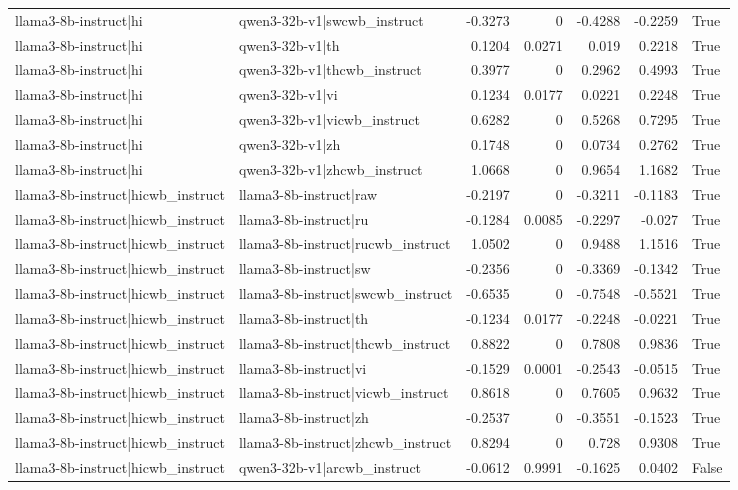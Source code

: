 \begin{table}
\begin{tabular}{l l r r r r l}
llama3-8b-instruct|hi & qwen3-32b-v1|swcwb_instruct & -0.3273 & 0 & -0.4288 & -0.2259 & True \\
llama3-8b-instruct|hi & qwen3-32b-v1|th & 0.1204 & 0.0271 & 0.019 & 0.2218 & True \\
llama3-8b-instruct|hi & qwen3-32b-v1|thcwb_instruct & 0.3977 & 0 & 0.2962 & 0.4993 & True \\
llama3-8b-instruct|hi & qwen3-32b-v1|vi & 0.1234 & 0.0177 & 0.0221 & 0.2248 & True \\
llama3-8b-instruct|hi & qwen3-32b-v1|vicwb_instruct & 0.6282 & 0 & 0.5268 & 0.7295 & True \\
llama3-8b-instruct|hi & qwen3-32b-v1|zh & 0.1748 & 0 & 0.0734 & 0.2762 & True \\
llama3-8b-instruct|hi & qwen3-32b-v1|zhcwb_instruct & 1.0668 & 0 & 0.9654 & 1.1682 & True \\
llama3-8b-instruct|hicwb_instruct & llama3-8b-instruct|raw & -0.2197 & 0 & -0.3211 & -0.1183 & True \\
llama3-8b-instruct|hicwb_instruct & llama3-8b-instruct|ru & -0.1284 & 0.0085 & -0.2297 & -0.027 & True \\
llama3-8b-instruct|hicwb_instruct & llama3-8b-instruct|rucwb_instruct & 1.0502 & 0 & 0.9488 & 1.1516 & True \\
llama3-8b-instruct|hicwb_instruct & llama3-8b-instruct|sw & -0.2356 & 0 & -0.3369 & -0.1342 & True \\
llama3-8b-instruct|hicwb_instruct & llama3-8b-instruct|swcwb_instruct & -0.6535 & 0 & -0.7548 & -0.5521 & True \\
llama3-8b-instruct|hicwb_instruct & llama3-8b-instruct|th & -0.1234 & 0.0177 & -0.2248 & -0.0221 & True \\
llama3-8b-instruct|hicwb_instruct & llama3-8b-instruct|thcwb_instruct & 0.8822 & 0 & 0.7808 & 0.9836 & True \\
llama3-8b-instruct|hicwb_instruct & llama3-8b-instruct|vi & -0.1529 & 0.0001 & -0.2543 & -0.0515 & True \\
llama3-8b-instruct|hicwb_instruct & llama3-8b-instruct|vicwb_instruct & 0.8618 & 0 & 0.7605 & 0.9632 & True \\
llama3-8b-instruct|hicwb_instruct & llama3-8b-instruct|zh & -0.2537 & 0 & -0.3551 & -0.1523 & True \\
llama3-8b-instruct|hicwb_instruct & llama3-8b-instruct|zhcwb_instruct & 0.8294 & 0 & 0.728 & 0.9308 & True \\
llama3-8b-instruct|hicwb_instruct & qwen3-32b-v1|arcwb_instruct & -0.0612 & 0.9991 & -0.1625 & 0.0402 & False \\

\end{tabular}
\end{table}
